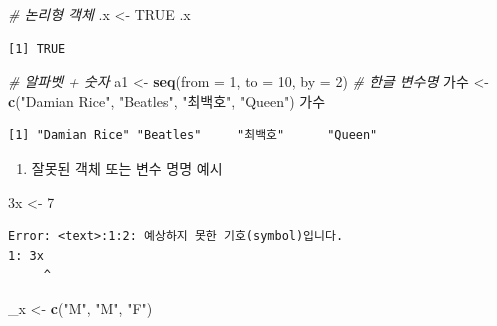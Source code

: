 \documentclass[11pt,a4paper]{book}
\newenvironment{Shaded}{\begin{snugshade}}{\end{snugshade}}
\newcommand{\KeywordTok}[1]{\textcolor[rgb]{0.13,0.29,0.53}{\textbf{#1}}}
\newcommand{\DataTypeTok}[1]{\textcolor[rgb]{0.13,0.29,0.53}{#1}}
\newcommand{\DecValTok}[1]{\textcolor[rgb]{0.00,0.00,0.81}{#1}}
\newcommand{\StringTok}[1]{\textcolor[rgb]{0.31,0.60,0.02}{#1}}
\newcommand{\CommentTok}[1]{\textcolor[rgb]{0.56,0.35,0.01}{\textit{#1}}}
\newcommand{\OtherTok}[1]{\textcolor[rgb]{0.56,0.35,0.01}{#1}}
\newcommand{\NormalTok}[1]{#1}
\providecommand{\tightlist}{%
  \setlength{\itemsep}{0pt}\setlength{\parskip}{0pt}}
\theoremstyle{definition}
\theoremstyle{definition}
\theoremstyle{definition}
\theoremstyle{remark}
\begin{document}
\begin{Shaded}
\begin{Highlighting}[]
\CommentTok{# 논리형 객체}
\NormalTok{.x <-}\StringTok{ }\OtherTok{TRUE}
\NormalTok{.x}
\end{Highlighting}
\end{Shaded}

\begin{verbatim}
[1] TRUE
\end{verbatim}

\begin{Shaded}
\begin{Highlighting}[]
\CommentTok{# 알파벳 + 숫자}
\NormalTok{a1 <-}\StringTok{ }\KeywordTok{seq}\NormalTok{(}\DataTypeTok{from =} \DecValTok{1}\NormalTok{, }\DataTypeTok{to =} \DecValTok{10}\NormalTok{, }\DataTypeTok{by =} \DecValTok{2}\NormalTok{)}
\CommentTok{# 한글 변수명}
\NormalTok{가수 <-}\StringTok{ }\KeywordTok{c}\NormalTok{(}\StringTok{"Damian Rice"}\NormalTok{, }\StringTok{"Beatles"}\NormalTok{, }\StringTok{"최백호"}\NormalTok{, }\StringTok{"Queen"}\NormalTok{)}
\NormalTok{가수}
\end{Highlighting}
\end{Shaded}

\begin{verbatim}
[1] "Damian Rice" "Beatles"     "최백호"      "Queen"      
\end{verbatim}

\normalsize

\begin{enumerate}
\def\labelenumi{\arabic{enumi}.}
\setcounter{enumi}{2}
\tightlist
\item
  잘못된 객체 또는 변수 명명 예시 \footnotesize
\end{enumerate}

\begin{Shaded}
\begin{Highlighting}[]
\NormalTok{3x <-}\StringTok{ }\DecValTok{7}
\end{Highlighting}
\end{Shaded}

\begin{verbatim}
Error: <text>:1:2: 예상하지 못한 기호(symbol)입니다.
1: 3x
     ^
\end{verbatim}

\normalsize

\footnotesize

\begin{Shaded}
\begin{Highlighting}[]
\NormalTok{_x <-}\StringTok{ }\KeywordTok{c}\NormalTok{(}\StringTok{"M"}\NormalTok{, }\StringTok{"M"}\NormalTok{, }\StringTok{"F"}\NormalTok{)}
\end{Highlighting}
\end{Shaded}
\end{document}
